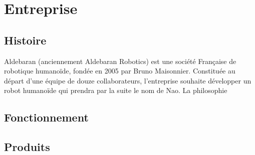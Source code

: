 \chapter*{Entreprise}
\label{Entreprise}
\thispagestyle{fancy}

\section{Histoire}
\label{Entreprise: histoire}
Aldebaran (anciennement Aldebaran Robotics) est une société Française de robotique humanoïde, fondée en 2005 par Bruno Maisonnier. 
Constituée au départ d'une équipe de douze collaborateurs, l'entreprise souhaite développer un robot humanoïde qui prendra par la suite le nom de Nao. La philosophie 

\section{Fonctionnement}

\section{Produits}